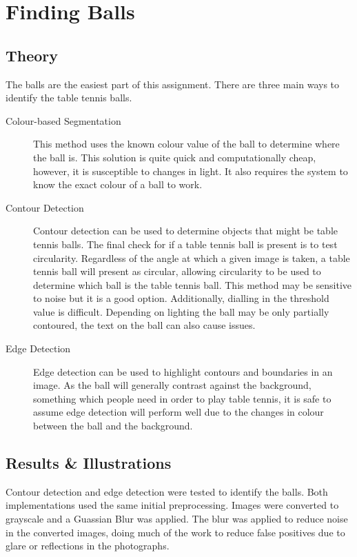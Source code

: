 \section{Finding Balls}
\subsection{Theory}
The balls are the easiest part of this assignment. There are three main ways to identify the table tennis balls.

\begin{description}
    \item[Colour-based Segmentation] This method uses the known colour value of the ball to determine where the ball is. This solution is quite quick and computationally cheap, however, it is susceptible to changes in light. It also requires the system to know the exact colour of a ball to work.
    \item[Contour Detection] Contour detection can be used to determine objects that might be table tennis balls. The final check for if a table tennis ball is present is to test circularity. Regardless of the angle at which a given image is taken, a table tennis ball will present as circular, allowing circularity to be used to determine which ball is the table tennis ball.  This method may be sensitive to noise but it is a good option. Additionally, dialling in the threshold value is difficult. Depending on lighting the ball may be only partially contoured, the text on the ball can also cause issues.
    \item[Edge Detection] Edge detection can be used to highlight contours and boundaries in an image. As the ball will generally contrast against the background, something which people need in order to play table tennis, it is safe to assume edge detection will perform well due to the changes in colour between the ball and the background. 
\end{description}

\subsection{Results \& Illustrations}
Contour detection and edge detection were tested to identify the balls. Both implementations used the same initial preprocessing. Images were converted to grayscale and a Guassian Blur was applied. The blur was applied to reduce noise in the converted images, doing much of the work to reduce false positives due to glare or reflections in the photographs.

